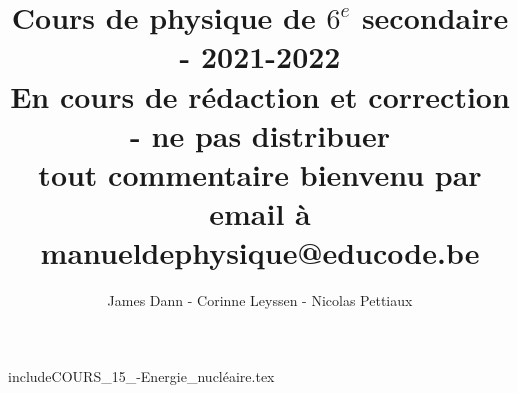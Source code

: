 \documentclass[11pt]{article}
\title{Cours de physique de $6^e$ secondaire - 2021-2022 \\
En cours de rédaction et correction - ne pas distribuer \\
tout commentaire bienvenu par email à \\
 manueldephysique@educode.be}
\author{James Dann - Corinne Leyssen - Nicolas Pettiaux}
\begin{document}
\maketitle
\doclicenseThis

\setcounter{tocdepth}{10}
\renewcommand\contentsname{Table des matières}
\tableofcontents

\hrulefill

%














include{COURS_15_-Energie_nucléaire.tex}


\end{document}
